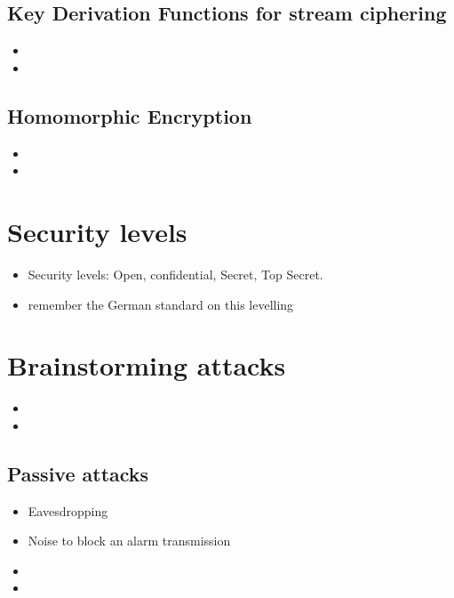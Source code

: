 \documentclass[10pt,a4paper,twoside]{llncs}
\begin{document}
%
\subsection{Key Derivation Functions for stream ciphering \label{sec:kdfStreaming}}

\begin{itemize}
 \item 
 \item 
\end{itemize}

%
\subsection{Homomorphic Encryption \label{sec:Homorph}}
\begin{itemize}
 \item 
 \item 
\end{itemize}



%
\section{Security levels \label{sec:secLevel}}

\begin{itemize}
 \item Security levels: Open, confidential, Secret, Top Secret.
 \item remember the German standard on this levelling
\end{itemize}

%
\section{Brainstorming attacks \label{sec:attacks}}

\begin{itemize}
 \item
 \item 
\end{itemize}

%
\subsection{Passive attacks \label{sec:passiveAttacks}}

\begin{itemize}
 \item Eavesdropping
 \item Noise to block an alarm transmission
 \item 
 \item 
\end{itemize}
\end{document}
